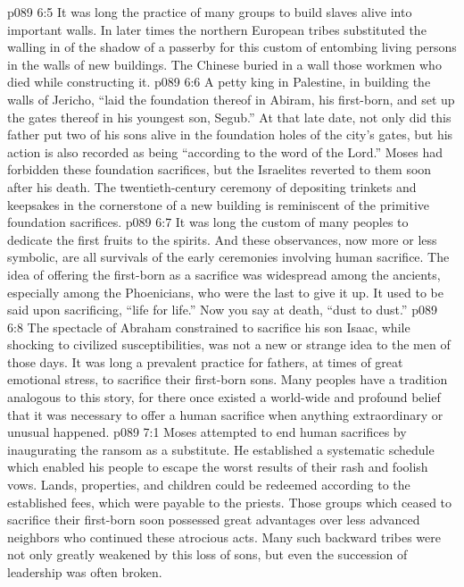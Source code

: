 \vs p089 6:5 It was long the practice of many groups to build slaves alive into important walls. In later times the northern European tribes substituted the walling in of the shadow of a passerby for this custom of entombing living persons in the walls of new buildings. The Chinese buried in a wall those workmen who died while constructing it.
\vs p089 6:6 A petty king in Palestine, in building the walls of Jericho, “laid the foundation thereof in Abiram, his first\hyp{}born, and set up the gates thereof in his youngest son, Segub.” At that late date, not only did this father put two of his sons alive in the foundation holes of the city’s gates, but his action is also recorded as being “according to the word of the Lord.” Moses had forbidden these foundation sacrifices, but the Israelites reverted to them soon after his death. The twentieth\hyp{}century ceremony of depositing trinkets and keepsakes in the cornerstone of a new building is reminiscent of the primitive foundation sacrifices.
\pc \vs p089 6:7 It was long the custom of many peoples to dedicate the first fruits to the spirits. And these observances, now more or less symbolic, are all survivals of the early ceremonies involving human sacrifice. The idea of offering the first\hyp{}born as a sacrifice was widespread among the ancients, especially among the Phoenicians, who were the last to give it up. It used to be said upon sacrificing, “life for life.” Now you say at death, “dust to dust.”
\vs p089 6:8 The spectacle of Abraham constrained to sacrifice his son Isaac, while shocking to civilized susceptibilities, was not a new or strange idea to the men of those days. It was long a prevalent practice for fathers, at times of great emotional stress, to sacrifice their first\hyp{}born sons. Many peoples have a tradition analogous to this story, for there once existed a world\hyp{}wide and profound belief that it was necessary to offer a human sacrifice when anything extraordinary or unusual happened.
\vs p089 7:1 Moses attempted to end human sacrifices by inaugurating the ransom as a substitute. He established a systematic schedule which enabled his people to escape the worst results of their rash and foolish vows. Lands, properties, and children could be redeemed according to the established fees, which were payable to the priests. Those groups which ceased to sacrifice their first\hyp{}born soon possessed great advantages over less advanced neighbors who continued these atrocious acts. Many such backward tribes were not only greatly weakened by this loss of sons, but even the succession of leadership was often broken.

